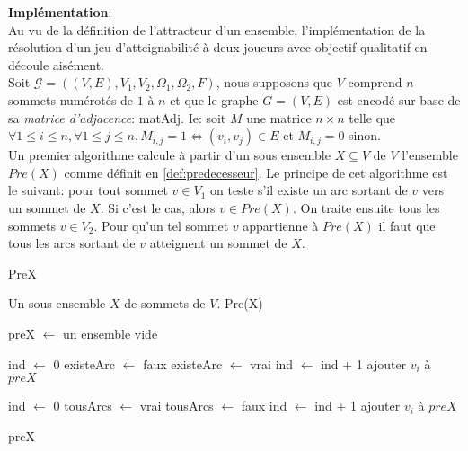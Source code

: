 \noindent\textbf{Implémentation}:\\

Au vu de la définition de l'attracteur d'un ensemble, l'implémentation de la résolution d'un jeu d'atteignabilité à deux joueurs avec objectif qualitatif en découle aisément. \\

Soit $\mathcal{G} = ((V,E),V_{1},V_{2},\Omega _{1}, \Omega _{2},F)$, nous supposons que $V$ comprend $n$ sommets numérotés de $1$ à $n$ et que le graphe $G = (V,E)$ est encodé sur base de sa \textit{matrice d'adjacence}: matAdj. Ie: soit $M$ une matrice $ n \times n $ telle que $ \forall 1 \leq i \leq n, \forall 1\leq j \leq n , M_{i,j} = 1 \Leftrightarrow (v_{i},v_{j})\in E $ et $M_{i,j} = 0$ sinon.\\

Un premier algorithme calcule à partir d'un sous ensemble $X \subseteq V$ de $V$ l'ensemble $Pre(X)$ comme définit en \ref{def:predecesseur}. Le principe de cet algorithme est le suivant: pour tout sommet $v\in V_{1}$ on teste s'il existe un arc sortant de $v$ vers un sommet de $X$. Si c'est le cas, alors $v\in Pre(X)$. On traite ensuite tous les sommets $v \in V_{2}$. Pour qu'un tel sommet $v$ appartienne à $Pre(X)$ il faut que tous les arcs sortant de $v$ atteignent un sommet de $X$.

\begin{algorithm}
	\caption{PreX}
	\begin{algorithmic}[1]
		\REQUIRE Un sous ensemble $X$ de sommets de $V$.
		\ENSURE Pre(X)
		
		\STATE preX $\leftarrow$ un ensemble vide
		
			\STATE ind $\leftarrow$ 0
			\STATE existeArc $\leftarrow$ faux
					\STATE existeArc $\leftarrow$ vrai
				\ELSE
					\STATE ind $\leftarrow$ ind + 1
				\ENDIF
			\ENDWHILE
				\STATE ajouter $v_{i}$ à $preX$
			\ENDIF
		\ENDFOR
		
			\STATE ind $\leftarrow$ 0
			\STATE tousArcs $\leftarrow$ vrai
					\STATE tousArcs $\leftarrow$ faux
				\ELSE
					\STATE ind $\leftarrow$ ind + 1
				\ENDIF
			\ENDWHILE
				\STATE ajouter $v_{i}$ à $preX$
			\ENDIF
		\ENDFOR
		
		\RETURN preX
			
\end{algorithmic}
		
\end{algorithm}

